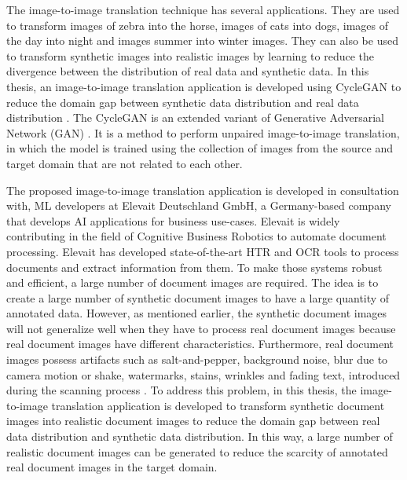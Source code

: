 The image-to-image translation technique has several applications. They are used to transform images of zebra into the horse, images of cats into dogs, images of the day into night and images summer into winter images. They can also be used to transform synthetic images into realistic images by learning to reduce the divergence between the distribution of real data and synthetic data. In this thesis, an image-to-image translation application is developed using \ac{CycleGAN} to reduce the domain gap between synthetic data distribution and real data distribution \cite{zhu2020unpaired}. The \ac{CycleGAN} is an extended variant of Generative Adversarial Network (\ac{GAN}) \cite{goodfellow2014generative}. It is a method to perform unpaired image-to-image translation, in which the model is trained using the collection of images from the source and target domain that are not related to each other\footnotemark.

The proposed image-to-image translation application is developed in consultation with, \ac{ML} developers at Elevait Deutschland GmbH, a Germany-based company that develops \ac{AI} applications for business use-cases. Elevait is widely contributing in the field of Cognitive Business Robotics \cite{Metta2012} to automate document processing. Elevait has developed state-of-the-art \ac{HTR} and \ac{OCR} tools to process documents and extract information from them. To make those systems robust and efficient, a large number of document images are required. The idea is to create a large number of synthetic document images to have a large quantity of annotated data. However, as mentioned earlier, the synthetic document images will not generalize well when they have to process real document images because real document images have different characteristics. Furthermore, real document images possess artifacts such as salt-and-pepper, background noise, blur due to camera motion or shake, watermarks, stains, wrinkles and fading text, introduced during the scanning process \cite{sharma2019learning}. To address this problem, in this thesis, the image-to-image translation application is developed to transform synthetic document images into realistic document images to reduce the domain gap between real data distribution and synthetic data distribution. In this way, a large number of realistic document images can be generated to reduce the scarcity of annotated real document images in the target domain.


